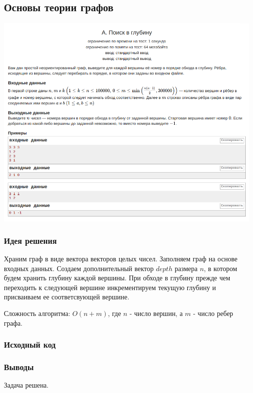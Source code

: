 \subsection*{Основы теории графов}

\begin{center}
\includegraphics[width=\textwidth]{statements/Contest7A.png}
\end{center}

\subsubsection*{Идея решения}

Храним граф в виде вектора векторов целых чисел. Заполняем граф на основе входных данных. Создаем дополнительный вектор $depth$ размера $n$, в котором будем хранить глубину каждой вершины. 
При обходе в глубину прежде чем переходить к следующей вершине
инкрементируем текущую глубину и присваиваем ее соответсвующей вершине.

Сложность алгоритма: $O(n + m)$, где $n$ - число вершин, а $m$ - число ребер графа. 

\subsubsection*{Исходный код}


\subsubsection*{Выводы}
Задача решена.
\newline

